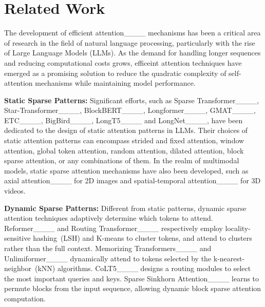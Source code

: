 \section{Related Work}
The development of efficient attention____ mechanisms has been a critical area of research in the field of natural language processing, particularly with the rise of Large Language Models (LLMs). As the demand for handling longer sequences and reducing computational costs grows, efficeint attention techniques have emerged as a promising solution to reduce the quadratic complexity of self-attention mechanisms while maintaining model performance.

\textbf{Static Sparse Patterns:}
Significant efforts, such as Sparse Transformer____, Star-Transformer____, BlockBERT____, Longformer____,
GMAT____, ETC____,
BigBird____, LongT5____ and LongNet____, have been dedicated to the design of static attention patterns in LLMs. 
Their choices of static attention patterns can encompass strided and fixed attention, window attention, global token attention, random attention, dilated attention, block sparse attention, or any combinations of them. 
In the realm of multimodal models, static sparse attention mechanisms have also been developed, such as axial attention____ for 2D images and spatial-temporal attention____ for 3D videos.

\textbf{Dynamic Sparse Patterns:}
Different from static patterns, dynamic sparse attention techniques adaptively determine which tokens to attend. 
Reformer____ and Routing Transformer____ respectively employ locality-sensitive hashing~(LSH) and K-means to cluster tokens, and attend to clusters rather than the full context. Memorizing Transformers____ and Unlimiformer____ dynamically attend to tokens selected by the k-nearest-neighbor~(kNN) algorithms. 
CoLT5____ designs a routing modules to select the most important queries and keys.
%
Sparse Sinkhorn Attention____ learns to permute blocks from the input sequence, allowing dynamic block sparse attention computation.


